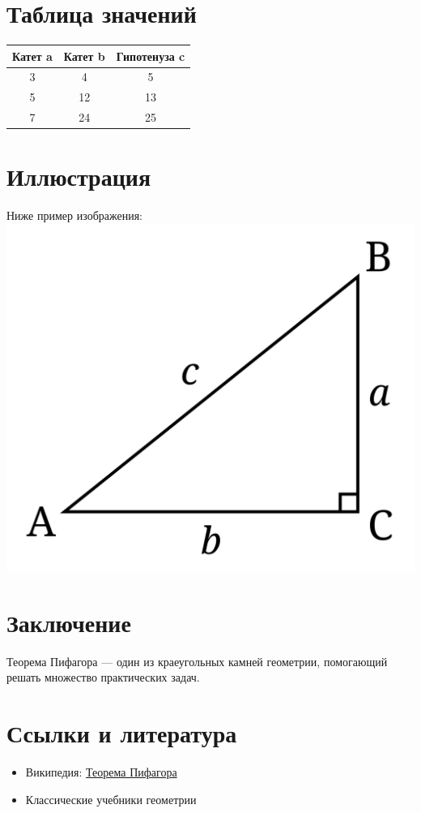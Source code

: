\documentclass{article}
\begin{document}
\section{Таблица значений}
\begin{center}
\begin{tabular}{|c|c|c|}
\hline
Катет a & Катет b & Гипотенуза c \\
\hline
3 & 4 & 5 \\
\hline
5 & 12 & 13 \\
\hline
7 & 24 & 25 \\
\hline
\end{tabular}
\end{center}
\section{Иллюстрация}
\newline Ниже пример изображения:
\newline 
\includegraphics[width=0.5\linewidth]{305-d805be53ab2d1978159d403df90369a4.png}
\section{Заключение}
\newline Теорема Пифагора — один из краеугольных камней геометрии, помогающий решать
 множество практических задач.
\section{Ссылки и литература}
\begin{itemize}
    \item Википедия: \href{https://ru.wikipedia.org/wiki/%D0%A2%D0%B5%D0%BE%D1%80%D0%B5%D0%BC%D0%B0_%D0%9F%D0%B8%D1%84%D0%B0%D0%B3%D0%BE%D1%80%D0%B0}{Теорема Пифагора}
    \item Классические учебники геометрии
\end{itemize}
\newpage 
\end{document}

